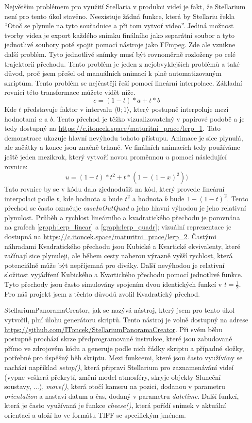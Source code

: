 \documentclass[12pt,a4paper,titlepage]{article}
\begin{document}
Největším problémem pro využití Stellaria v produkci videí je fakt, že Stellarium není pro tento úkol stavěno. Neexistuje žádná funkce, která by Stellariu řekla \enquote{Otoč se plynule na tyto souřadnice a při tom vytvoř video}. Jediná možnost tvorby videa je export každého snímku finálního jako separátní soubor a tyto jednotlivé soubory poté spojit pomocí nástroje jako FFmpeg. Zde ale vznikne další problém. Tyto jednotlivé snímky musí být rovnoměrně rozloženy po celé trajektorii přechodu. Tento problém je jeden z nejobvyklejších problémů a také důvod, proč jsem přešel od manuálních animací k plně automatizovaným skriptům. Tento problém se nejčastěji řeší pomocí lineární interpolace. Základní rovnici této transformace můžete vidět níže.
\[c = (1-t)*a + t * b\] 
Kde $t$ představuje faktor v intervalu $\langle0;1\rangle$, který postupně interpoluje mezi hodnotami $a$ a $b$. Tento přechod je těžko vizualizovatelný v papírové podobě a je tedy dostupný na \url{https://c.itoncek.space/maturitni_prace/lerp_1}. Tato demonstrace ukazuje hlavní nevýhodu tohoto přístupu. Animace je sice plynulá, ale začátky a konce jsou značně trhané. Ve finálních animacích tedy používáme ještě jeden mezikrok, který vytvoří novou proměnnou $u$ pomocí následující rovnice:
\[u = (1 - t) * t^2 + t * (1-(1-x)^2))\]
Tato rovnice by se v kódu dala zjednodušit na kód, který provede lineární interpolaci podle $t$, kde hodnota $a$ bude $t^{2}$ a hodnota $b$ bude $1-(1-t)^{2}$. Tento přechod se často označuje \textit{easeInOutQuad} a jeho hlavní výhodou je jeho relativní plynulost. Průběh a rychlost lineárního a kvadratického přechodu je porovnána na grafech \ref{graph:lerp_linear} a \ref{graph:lerp_quadr}; vizuální reprezentace je dostupná na \url{https://c.itoncek.space/maturitni_prace/lerp_2}. Častými náhradami Kvadratického přechodu jsou Kubické a Kvartické ekvivalenty, které začínají sice plynuleji, ale během cesty naberou výrazně vyšší rychlost, která potenciálně může být nepříjemná pro diváky. Další nevýhodou je relativní složitost vyjádření Kubického a Kvartického přechodu pomocí jednotlivé funkce. Tyto přechody jsou často simulovány spojením dvou identických funkcí v $t=\frac{1}{2}$. Pro náš projekt jsem z těchto důvodů zvolil Kvadratický přechod.

StellariumPanoramaCreator, jak se nazývá nástroj, který jsem pro tento úkol vytvořil, plní úlohu generátoru skriptů. Tento nástroj je volně dostupný na adrese \url{https://github.com/IToncek/StellariumPanoramaCreator}. Při svém běhu postupně prochází skrze předprogramované instrukce, které jsou zabudované přímo ve zdrojovém kódu a generuje podle nich řádky skriptu a případné složky, potřebné pro úspěšný běh skriptu. Mezi funkcemi, které jsou často využívány se nachází například \textit{setup()}, která připraví Stellarium pro zaznamenávání videí (vypne veškerá překrytí, změní model atmosféry, skryje objekty Sluneční soustavy, ...), \textit{move()}, která otočí kameru na pozici, dodanou v parametru \textit{orientation} a nastaví datum a čas, dodaný v parametru \textit{datetime}. Další funkcí, která je často využívaná je funkce \textit{cheese()}, která pořídí snímek v aktuální orientaci a uloží ho ve formátu TIFF se specifickým jménem.
\end{document}
